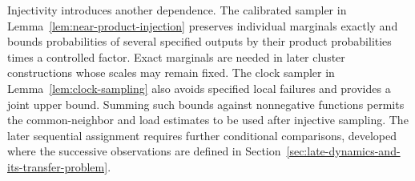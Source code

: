 Injectivity introduces another dependence. The calibrated sampler in
Lemma~\ref{lem:near-product-injection} preserves individual marginals
exactly and bounds probabilities of several specified outputs by their
product probabilities times a controlled factor. Exact marginals are
needed in later cluster constructions whose scales may remain fixed.
The clock sampler in Lemma~\ref{lem:clock-sampling} also avoids specified
local failures and provides a joint upper bound. Summing such bounds
against nonnegative functions permits the common-neighbor and load
estimates to be used after injective sampling. The later sequential
assignment requires further conditional comparisons, developed where the
successive observations are defined in
Section~\ref{sec:late-dynamics-and-its-transfer-problem}.
